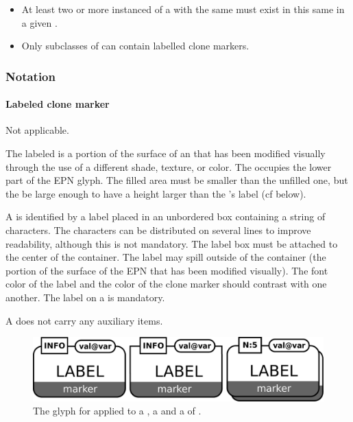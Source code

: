 \begin{itemize}
\item At least two or more instanced of a
   with the same  must
  exist in this same in a given .
\item Only subclasses of  can contain
labelled clone markers.
\end{itemize}

\subsubsection{Notation}

\paragraph{Labeled clone marker}

\begin{glyphDescription}

\glyphSboTerm Not applicable.

\glyphContainer The labeled  is a portion of the surface of an  that has been modified visually through the use of a different shade, texture, or color.  The  occupies the lower part of the EPN glyph. The filled area must be smaller than the unfilled one, but the be large enough to have a height larger than the 's label (cf below).  

\glyphLabel A  is identified by a label placed in an unbordered box containing a string of characters.  The characters can be distributed on several lines to improve readability, although this is not mandatory.  The label box must be attached to the center of the container.  The label may spill outside of the container (the portion of the surface of the EPN that has been modified visually).  The font color of the label and the color of the clone marker should contrast with one another.  The label on a  is mandatory.

\glyphAux A  does not carry any auxiliary items.

\end{glyphDescription}

\begin{figure}[H]
  \centering
  \includegraphics[scale = 0.3]{images/labeledCloneMarker}
  \caption{The \PD glyph for  applied to a , a  and a  of .}
  \label{fig:labeledCloneMarker}
\end{figure}


